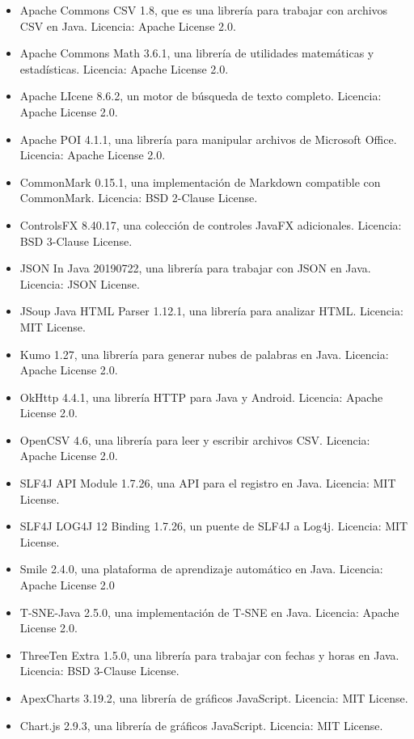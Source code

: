 \begin{itemize}
    \item Apache Commons CSV 1.8, que es una librería para trabajar con archivos CSV en Java. Licencia: Apache License 2.0.
    \item Apache Commons Math 3.6.1, una librería de utilidades matemáticas y estadísticas. Licencia: Apache License 2.0.
    \item Apache LIcene 8.6.2, un motor de búsqueda de texto completo. Licencia: Apache License 2.0.
    \item Apache POI 4.1.1, una librería para manipular archivos de Microsoft Office. Licencia: Apache License 2.0.
    \item CommonMark 0.15.1, una implementación de Markdown compatible con CommonMark. Licencia: BSD 2-Clause License.
    \item ControlsFX 8.40.17, una colección de controles JavaFX adicionales. Licencia: BSD 3-Clause License.
    \item JSON In Java 20190722, una librería para trabajar con JSON en Java. Licencia: JSON License.
    \item JSoup Java HTML Parser 1.12.1, una librería para analizar HTML. Licencia: MIT License.
    \item Kumo 1.27, una librería para generar nubes de palabras en Java. Licencia: Apache License 2.0.
    \item OkHttp 4.4.1, una librería HTTP para Java y Android. Licencia: Apache License 2.0.
    \item OpenCSV 4.6, una librería para leer y escribir archivos CSV. Licencia: Apache License 2.0.
    \item SLF4J API Module 1.7.26, una API para el registro en Java. Licencia: MIT License.
    \item SLF4J LOG4J 12 Binding 1.7.26, un puente de SLF4J a Log4j. Licencia: MIT License.
    \item Smile 2.4.0, una plataforma de aprendizaje automático en Java. Licencia: Apache License 2.0
    \item T-SNE-Java 2.5.0, una implementación de T-SNE en Java. Licencia: Apache License 2.0. 
    \item ThreeTen Extra 1.5.0, una librería para trabajar con fechas y horas en Java. Licencia: BSD 3-Clause License.
    \item ApexCharts 3.19.2, una librería de gráficos JavaScript. Licencia: MIT License.
    \item Chart.js 2.9.3, una librería de gráficos JavaScript. Licencia: MIT License.

\end{itemize}
